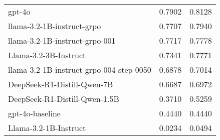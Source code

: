 \begin{tabular}{lrr}
gpt-4o & 0.7902 & 0.8128 \\
llama-3.2-1B-instruct-grpo & 0.7707 & 0.7940 \\
llama-3.2-1B-instruct-grpo-001 & 0.7717 & 0.7778 \\
Llama-3.2-3B-Instruct & 0.7341 & 0.7771 \\
llama-3.2-1B-instruct-grpo-004-step-0050 & 0.6878 & 0.7014 \\
DeepSeek-R1-Distill-Qwen-7B & 0.6687 & 0.6972 \\
DeepSeek-R1-Distill-Qwen-1.5B & 0.3710 & 0.5259 \\
gpt-4o-baseline & 0.4440 & 0.4440 \\
Llama-3.2-1B-Instruct & 0.0234 & 0.0494 \\
\bottomrule
\end{tabular}
